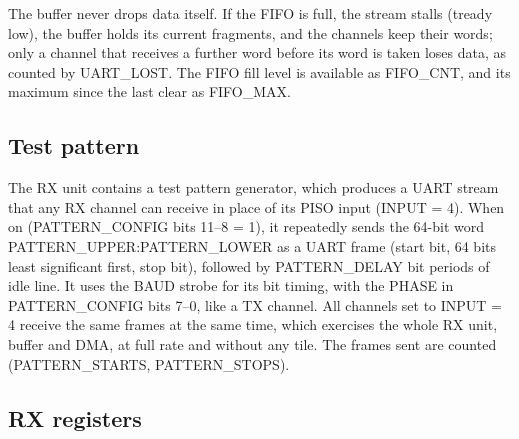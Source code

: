 \documentclass[12pt]{article}
\begin{document}
The buffer never drops data itself.  If the FIFO is full, the stream stalls (tready low), the buffer holds
its current fragments, and the channels keep their words; only a channel that receives a further word before
its word is taken loses data, as counted by UART\_LOST.  The FIFO fill level is available as FIFO\_CNT, and
its maximum since the last clear as FIFO\_MAX.

\subsection{Test pattern}\label{sec:rx-pattern}

The RX unit contains a test pattern generator, which produces a UART stream that any RX channel can receive
in place of its PISO input (INPUT = 4).  When on (PATTERN\_CONFIG bits 11--8 = 1), it repeatedly sends the
64-bit word PATTERN\_UPPER:PATTERN\_LOWER as a UART frame (start bit, 64 bits least significant first, stop bit),
followed by PATTERN\_DELAY bit periods of idle line.  It uses the BAUD strobe for its bit timing, with the
PHASE in PATTERN\_CONFIG bits 7--0, like a TX channel.  All channels set to INPUT = 4 receive the same frames
at the same time, which exercises the whole RX unit, buffer and DMA, at full rate and without any tile.  The
frames sent are counted (PATTERN\_STARTS, PATTERN\_STOPS).

\subsection{RX registers}
\end{document}
